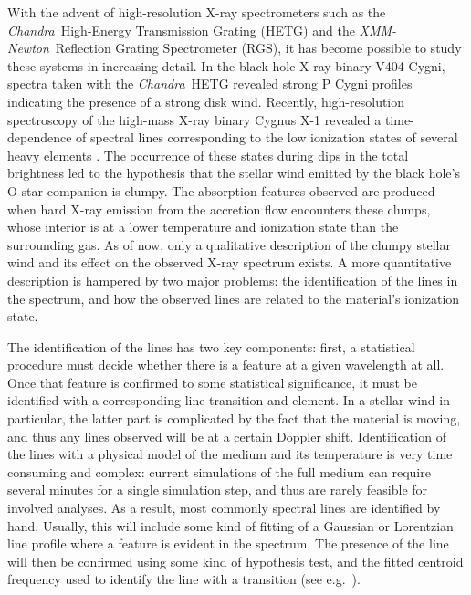 \documentclass[12pt]{emulateapj}
\newcommand{\project}[1]{\textsl{#1}}
\newcommand{\chandra}{\project{Chandra}}
\newcommand{\xmm}{\project{XMM-Newton}}
\begin{document}
With the advent of high-resolution X-ray spectrometers such as the \chandra\ High-Energy Transmission Grating (HETG) and the \xmm\ Reflection Grating Spectrometer (RGS), it has become possible to study these systems in increasing detail. In the black hole X-ray binary V404 Cygni, spectra taken with the \chandra\ HETG revealed strong P Cygni profiles indicating the presence of a strong disk wind. Recently, high-resolution spectroscopy of the high-mass X-ray binary Cygnus X-1 revealed a time-dependence of spectral lines corresponding to the low ionization states of several heavy elements \citep{hirsch_inprep}. The occurrence of these states during dips in the total brightness led to the hypothesis that the stellar wind emitted by the black hole's O-star companion is clumpy. The absorption features observed are produced when hard X-ray emission from the accretion flow encounters these clumps, whose interior is at a lower temperature and ionization state than the surrounding gas. As of now, only a qualitative description of the clumpy stellar wind and its effect on the observed X-ray spectrum exists. A more quantitative description is hampered by two major problems: the identification of the lines in the spectrum, and how the observed lines are related to the material's ionization state. 

The identification of the lines has two key components: first, a statistical procedure must decide whether there is a feature at a given wavelength at all. Once that feature is confirmed to some statistical significance, it must be identified with a corresponding line transition and element. In a stellar wind in particular, the latter part is complicated by the fact that the material is moving, and thus any lines observed will be at a certain Doppler shift. Identification of the lines with a physical model of the medium and its temperature is very time consuming and complex: current simulations of the full medium can require several minutes for a single simulation step, and thus are rarely feasible for involved analyses. As a result, most commonly spectral lines are identified by hand. Usually, this will include some kind of fitting of a Gaussian or Lorentzian line profile where a feature is evident in the spectrum. The presence of the line will then be confirmed using some kind of hypothesis test, and the fitted centroid frequency used to identify the line with a transition (see e.g.\ \citealt{protassov2002}). 
\end{document}
